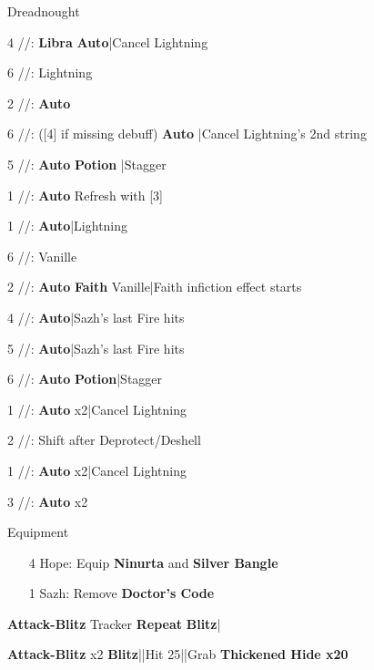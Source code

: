 \begin{fight}{Dreadnought}
	\item [4] \rav/\rav/\sab: \textbf{Libra} \to \textbf{Auto}|Cancel Lightning
	\item [6] \rav/\rav/\rav: Lightning
	\item [2] \syn/\com/\sab: \textbf{Auto}
	\item [6] \rav/\rav/\rav: ([4] if missing debuff) \textbf{Auto}
	|Cancel Lightning's 2nd string
	\item [5] \rav/\rav/\rav: \textbf{Auto} \to \textbf{Potion}
	|Stagger
	\item [1] \rav/\com/\rav: \textbf{Auto} \to Refresh with [3]
	\item \skip
	\item [1] \rav/\com/\rav: \textbf{Auto}|Lightning
	\item [6] \rav/\rav/\rav: Vanille
	\item [2] \syn/\com/\sab: \textbf{Auto} \to \textbf{Faith} Vanille|Faith infiction effect starts
	\item [4] \rav/\rav/\sab: \textbf{Auto}|Sazh's last Fire hits
	\item [5] \rav/\rav/\rav: \textbf{Auto}|Sazh's last Fire hits
	\item [6] \rav/\rav/\rav: \textbf{Auto} \to \textbf{Potion}|Stagger
	\item [1] \rav/\com/\rav: \textbf{Auto} x2|Cancel Lightning
	\item [2] \syn/\com/\sab: Shift after Deprotect/Deshell
	\item [1] \rav/\com/\rav: \textbf{Auto} x2|Cancel Lightning
	\item [3] \rav/\com/\rav: \textbf{Auto} x2
	\item \skip
\end{fight}

\begin{menu}
	\item Equipment
	\begin{itemize}
		\item [4] Hope: Equip \textbf{Ninurta} and \textbf{Silver Bangle}
		\item [1] Sazh: Remove \textbf{Doctor's Code}
	\end{itemize}
\end{menu}

\begin{mainlist}
	\item {}
	\item {}\textbf{Attack-Blitz} Tracker \to
	[2] \textbf{Repeat} \to \textbf{Blitz}|
	\item \skip
	\item {} \textbf{Attack-Blitz} x2 \to
	\textbf{Blitz}|\skip|Hit 25|\skip|Grab \textbf{Thickened Hide x20}
\end{mainlist}

